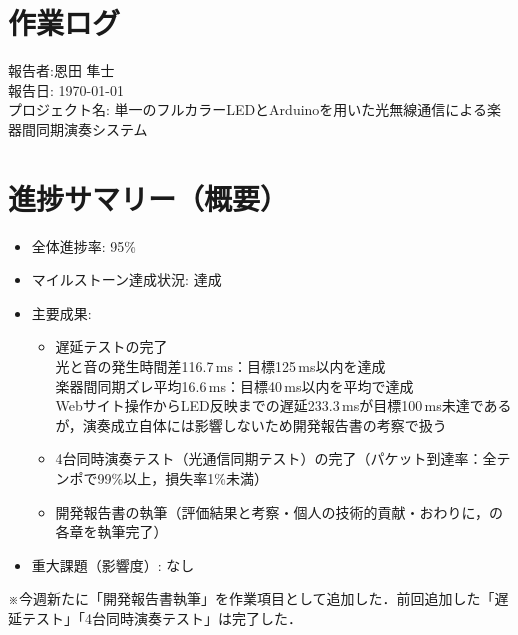 \documentclass[lualatex,paper=a4paper,jafontsize=11.5pt,jafontscale=1.05]{jlreq}
\begin{document}
\section*{作業ログ}
\noindent
報告者:恩田 隼士\\
報告日: \today \\
プロジェクト名: 単一のフルカラーLEDとArduinoを用いた光無線通信による楽器間同期演奏システム \\
\hrulefill

\section{進捗サマリー（概要）}
\begin{itemize}
 \item 全体進捗率: 95\%
 \item マイルストーン達成状況: 達成
 \item 主要成果:
 \begin{itemize}
    \item 遅延テストの完了\\
    光と音の発生時間差116.7\,ms：目標125\,ms以内を達成\\
    楽器間同期ズレ平均16.6\,ms：目標40\,ms以内を平均で達成\\
    Webサイト操作からLED反映までの遅延233.3\,msが目標100\,ms未達であるが，演奏成立自体には影響しないため開発報告書の考察で扱う
    \item 4台同時演奏テスト（光通信同期テスト）の完了（パケット到達率：全テンポで99\%以上，損失率1\%未満）
    \item 開発報告書の執筆（評価結果と考察・個人の技術的貢献・おわりに，の各章を執筆完了）
 \end{itemize}
 \item 重大課題（影響度）: なし
\end{itemize}

\noindent
※今週新たに「開発報告書執筆」を作業項目として追加した．前回追加した「遅延テスト」「4台同時演奏テスト」は完了した．
\end{document}
